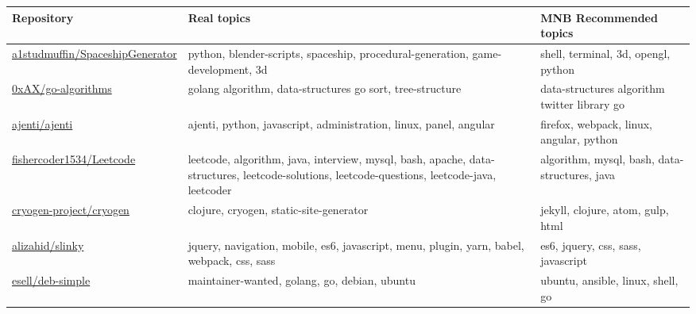 \begin{table*}[]
	\centering
	\footnotesize
	\begin{tabular}{|p{3.8cm} | p{5.2cm} | p{3.2cm} |}
	\hline	\bf Repository\                                                                          & \bf Real topics                                                                                              & \bf MNB Recommended topics                                                                                                                                  \\ \hline
		\href{https://github.com/a1studmuffin/SpaceshipGenerator}{a1studmuffin/SpaceshipGenerator} & python, blender-scripts, spaceship, procedural-generation, game-development, 3d                                                         & shell, terminal, 3d,	opengl,	python                                                                                        \\ \hline
		\href{https://github.com/0xAX/go-algorithms}{0xAX/go-algorithms}                           & golang algorithm,	data-structures	go	sort, tree-structure                                                                           & data-structures	algorithm twitter library go                                                  \\ \hline
		\href{https://github.com/ajenti/ajenti}{ajenti/ajenti}                                     & ajenti, python,  javascript, administration, linux, panel, angular                                                                      & firefox, webpack,	linux, angular, python \\ \hline
		\href{https://github.com/fishercoder1534/Leetcode}{fishercoder1534/Leetcode}               & leetcode, algorithm, java, interview, mysql, bash, apache, data-structures,	leetcode-solutions, leetcode-questions, leetcode-java, leetcoder & algorithm,	mysql,	bash,	data-structures,	java \\ \hline
		\href{https://github.com/cryogen-project/cryogen}{cryogen-project/cryogen}                 & clojure, cryogen, static-site-generator & jekyll, clojure, atom, gulp, html   \\ \hline
		\href{https://github.com/alizahid/slinky}{alizahid/slinky}                                 & jquery, navigation, mobile, es6, javascript, menu, plugin, yarn, babel, webpack, css, sass & es6, jquery, css, sass, javascript          \\ \hline
		\href{https://github.com/esell/deb-simple}{esell/deb-simple}                               & maintainer-wanted, golang,	go, debian, ubuntu                                                                                         & ubuntu, ansible,	linux, shell, 	go \\ \hline

\end{tabular}
\end{table*}
